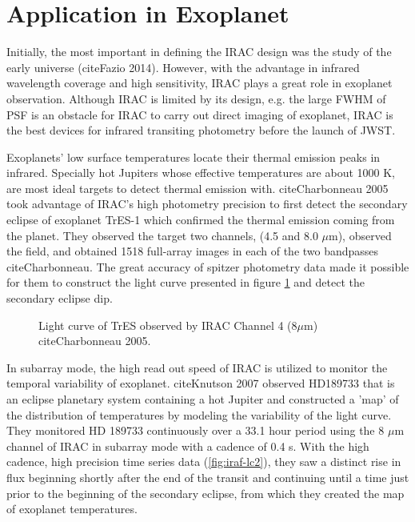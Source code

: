 \documentclass[preprint, 12pt]{aastex}
\begin{document}
\section{Application in Exoplanet}

Initially, the most important in defining the IRAC design was the
study of the early universe (cite{Fazio 2014}). However, with the
advantage in infrared wavelength coverage and high sensitivity, IRAC
plays a great role in exoplanet observation. Although IRAC is limited
by its design, e.g. the large FWHM of PSF is an obstacle for IRAC to
carry out direct imaging of exoplanet, IRAC is the best devices for
infrared transiting photometry before the launch of JWST. \par

Exoplanets' low surface temperatures locate their thermal emission
peaks in infrared. Specially hot Jupiters whose effective
temperatures are about 1000 K, are most ideal targets to detect
thermal emission with. cite{Charbonneau 2005} took advantage of IRAC's
high photometry precision to first detect the secondary eclipse of
exoplanet TrES-1 which confirmed the thermal emission coming from the
planet. They observed the target two channels, (4.5 and 8.0 $\mu$m),
observed the field, and obtained 1518 full-array images in each of the
two bandpasses cite{Charbonneau}. The great accuracy of spitzer
photometry data made it possible for them to construct the light curve
presented in figure \ref{fig:irac-lc} and detect the secondary eclipse
dip.\par

\begin{figure}
  \centering
  \caption{Light curve of TrES observed by IRAC Channel 4 (8$\mu$m)
    cite{Charbonneau 2005}.}
  \label{fig:irac-lc}
\end{figure}

In subarray mode, the high read out speed of IRAC is utilized to
monitor the temporal variability of exoplanet. cite{Knutson 2007}
observed HD189733 that is an eclipse planetary system containing a hot
Jupiter and constructed a ’map’ of the distribution of temperatures by
modeling the variability of the light curve. They monitored HD 189733
continuously over a 33.1 hour period using the 8 $\mu$m channel of
IRAC in subarray mode with a cadence of 0.4 s. With the high cadence,
high precision time series data (\ref{fig:iraf-lc2}), they saw a
distinct rise in flux beginning shortly after the end of the transit
and continuing until a time just prior to the beginning of the
secondary eclipse, from which they created the map of exoplanet
temperatures.\par
\end{document}
